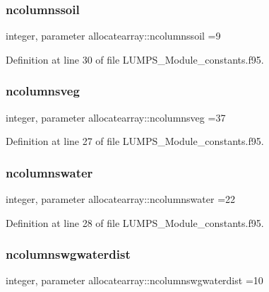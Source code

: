 \subsubsection{\texorpdfstring{ncolumnssoil}{ncolumnssoil}}
{\footnotesize\ttfamily integer, parameter allocatearray\+::ncolumnssoil =9}



Definition at line 30 of file L\+U\+M\+P\+S\+\_\+\+Module\+\_\+constants.\+f95.

\mbox{\label{namespaceallocatearray_a6b492adaf9d6e5563a21d571d5b8f6ec}} 
\subsubsection{\texorpdfstring{ncolumnsveg}{ncolumnsveg}}
{\footnotesize\ttfamily integer, parameter allocatearray\+::ncolumnsveg =37}



Definition at line 27 of file L\+U\+M\+P\+S\+\_\+\+Module\+\_\+constants.\+f95.

\mbox{\label{namespaceallocatearray_a58f6aaf0837a4d8d3383254237a26732}} 
\subsubsection{\texorpdfstring{ncolumnswater}{ncolumnswater}}
{\footnotesize\ttfamily integer, parameter allocatearray\+::ncolumnswater =22}



Definition at line 28 of file L\+U\+M\+P\+S\+\_\+\+Module\+\_\+constants.\+f95.

\mbox{\label{namespaceallocatearray_a85d1a0c9782006900e2d2a379ba269c8}} 
\subsubsection{\texorpdfstring{ncolumnswgwaterdist}{ncolumnswgwaterdist}}
{\footnotesize\ttfamily integer, parameter allocatearray\+::ncolumnswgwaterdist =10}



